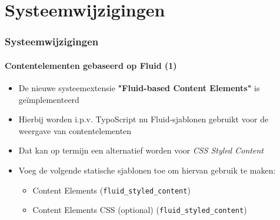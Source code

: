 %

\section{Systeemwijzigingen}


\begin{frame}[fragile]
	\frametitle{Systeemwijzigingen}
	\framesubtitle{Contentelementen gebaseerd op Fluid (1)}

	\begin{itemize}

		\item De nieuwe systeemextensie \textbf{"Fluid-based Content Elements"} is geïmplementeerd

		\item Hierbij worden i.p.v. TypoScript nu Fluid-sjablonen gebruikt voor de weergave van contentelementen

		\item Dat kan op termijn een alternatief worden voor \textit{CSS Styled Content}

		\item Voeg de volgende statische sjablonen toe om hiervan gebruik te maken:

			\begin{itemize}
				\item Content Elements (\texttt{fluid\_styled\_content})
				\item Content Elements CSS (optional) (\texttt{fluid\_styled\_content})
			\end{itemize}

	\end{itemize}

\end{frame}



